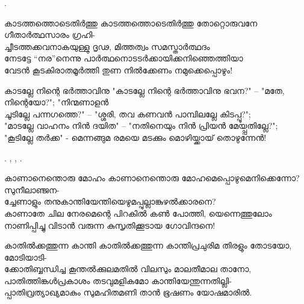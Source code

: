 \begin{enumerate}


.


\begin{slokam}{\VSv}{\NNM}{കാടത്തത്തൊടെതിർത്തു}
കാടത്തത്തൊടെതിർത്തു തോറ്റൊരുവനേ ഗീതാർത്ഥസാരം ഗ്രഹി-\\
ച്ചീടത്തക്കവനാകയുള്ളു ദൃഢ, മിത്തത്വം സമസ്താർത്ഥദം\\
നേടട്ടേ ``നര''നെന്നു പാർത്ഥനൊടടർക്കായിക്കനിഞ്ഞെത്തിയാ\\
വേടൻ കൂടകിരാതമൂർത്തി തുണ നിൽക്കേണം നമുക്കെപ്പൊഴും!
\end{slokam}


\begin{slokam}{\VSr}{\VenM}{കാടല്ലേ നിന്റെ ഭർത്താവിനു}
"കാടല്ലേ നിന്റെ ഭർത്താവിനു ഭവന?" -- "മതേ, നിന്റെയോ?"; "നിന്മണാളൻ\\
ചൂടില്ലേ പന്നഗത്തെ?" -- "ശ്ശരി, തവ കണവൻ പാമ്പിലല്ലേ കിടപ്പൂ?";\\
"മാടല്ലേ വാഹനം നിൻ ദയിത" -- "നതിനെയും നിൻ പ്രിയൻ മേയ്പ്പതില്ലേ?";\\
"കൂടില്ലേ തർക്ക" - മെന്നങ്ങുമ രമയെ മടക്കും മൊഴിയ്ക്കായ്‌ തൊഴുന്നേൻ!
\end{slokam}


. , 
, .

\begin{slokam}{\VSv}{\KND}{കാണാനെന്തൊരു മോഹം}
കാണാനെന്തൊരു മോഹമെപ്പൊഴുമെനിക്കെന്നോ?  സുനീലാഞ്ജന-\\
ച്ചേണാളും തനുകാന്തിയേന്തിയെഴുമപ്പുല്ലാങ്കുഴൽക്കാരനെ?\\
കാണാതേ ചില നേരമെന്റെ പിറകിൽ കൺ പോത്തി, യെന്നെത്തുലോം \\
നാണിപ്പിച്ചു വിടാൻ വരുന്ന കുസൃതിക്കൂടായ ഗോവിന്ദനെ!
\end{slokam}



\begin{slokam}{\VSr}{\KCKP}{കാതില്‍ക്കത്തുന്ന കാന്തി}
കാതില്‍ക്കത്തുന്ന കാന്തിപ്രചുരിമ തിരളും തോടയോ, മോടിയാടി-\\
ക്കോതിബ്ബന്ധിച്ച കൂന്തല്‍ക്കുലമതില്‍ വിലസും മാലതീമാല താനോ,\\
പാതിത്തിങ്കള്‍പ്രകാശം തടവുമളികമോ കാന്തിയേന്തുന്നതില്ലി-\\
പ്പാതിവ്രത്യാഖ്യമാകും സുമഹിതമണി താന്‍ ഭൂഷണം യോഷമാരില്‍.
\end{slokam}


\end{enumerate}
